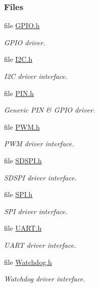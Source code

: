 \subsubsection*{Files}
\begin{DoxyCompactItemize}
\item 
file \hyperlink{_g_p_i_o_8h}{G\-P\-I\-O.\-h}
\begin{DoxyCompactList}\small\item\em G\-P\-I\-O driver. \end{DoxyCompactList}\item 
file \hyperlink{_i2_c_8h}{I2\-C.\-h}
\begin{DoxyCompactList}\small\item\em I2\-C driver interface. \end{DoxyCompactList}\item 
file \hyperlink{_p_i_n_8h}{P\-I\-N.\-h}
\begin{DoxyCompactList}\small\item\em Generic P\-I\-N \& G\-P\-I\-O driver. \end{DoxyCompactList}\item 
file \hyperlink{_p_w_m_8h}{P\-W\-M.\-h}
\begin{DoxyCompactList}\small\item\em P\-W\-M driver interface. \end{DoxyCompactList}\item 
file \hyperlink{_s_d_s_p_i_8h}{S\-D\-S\-P\-I.\-h}
\begin{DoxyCompactList}\small\item\em S\-D\-S\-P\-I driver interface. \end{DoxyCompactList}\item 
file \hyperlink{_s_p_i_8h}{S\-P\-I.\-h}
\begin{DoxyCompactList}\small\item\em S\-P\-I driver interface. \end{DoxyCompactList}\item 
file \hyperlink{_u_a_r_t_8h}{U\-A\-R\-T.\-h}
\begin{DoxyCompactList}\small\item\em U\-A\-R\-T driver interface. \end{DoxyCompactList}\item 
file \hyperlink{_watchdog_8h}{Watchdog.\-h}
\begin{DoxyCompactList}\small\item\em Watchdog driver interface. \end{DoxyCompactList}\end{DoxyCompactItemize}
